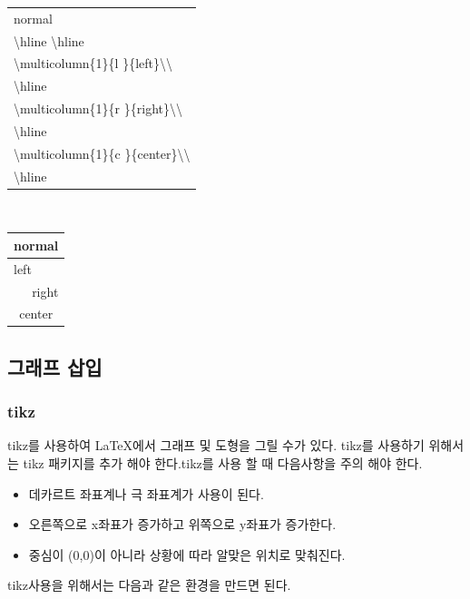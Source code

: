 \documentclass[12pt]{article}
\begin{document}
	\begin{center}
		\onehalfspacing
		\begin{tabular}{|l|}
			\hline
			normal\\
			\textbackslash hline
			\textbackslash hline\\
			\textbackslash multicolumn\{1\}\{\textbar l \textbar\}\{left\}\textbackslash\textbackslash\\
			\textbackslash hline\\
			\textbackslash multicolumn\{1\}\{\textbar r \textbar\}\{right\}\textbackslash\textbackslash\\
			\textbackslash hline\\
			\textbackslash multicolumn\{1\}\{\textbar c \textbar\}\{center\}\textbackslash\textbackslash\\
			\textbackslash hline\\
			\hline
		\end{tabular}
		\ \ \ \ \ \ 
		\begin{tabular}{|l|}
			\hline
			normal\\
			\hline
			\multicolumn{1}{|l|}{left}\\
			\hline
			\multicolumn{1}{|r|}{right}\\
			\hline
			\multicolumn{1}{|c|}{center}\\
			\hline
		\end{tabular}
	\end{center}\clearpage
	\subsection{그래프 삽입}
	\subsubsection{tikz}
	tikz를 사용하여 \LaTeX 에서 그래프 및 도형을 그릴 수가 있다. tikz를 사용하기 위해서는 tikz 패키지를 추가 해야 한다.\newline tikz를 사용 할 때 다음사항을 주의 해야 한다.
	\begin{itemize}
		\item 데카르트 좌표계나 극 좌표계가 사용이 된다.
		\item 오른쪽으로 x좌표가 증가하고 위쪽으로 y좌표가 증가한다.
		\item 중심이 (0,0)이 아니라 상황에 따라 알맞은 위치로 맞춰진다.
	\end{itemize}
	tikz사용을 위해서는 다음과 같은 환경을 만드면 된다.\newline
	
\end{document}
